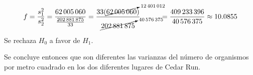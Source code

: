 \begin{solucion}
 \begin{estadistico}
  \begin{equation*}
   f = \frac{s_1^2}{s_2^2}
   = \frac{62\,005\,060}{\frac{202\,881\,875}{33}}
   = \frac{33(\cancelto{12\,401\,012}{62\,005\,060})}
   {\cancelto{40\,576\,375}{202\,881\,875}} \hspace{1cm}
   = \frac{409\,233\,396}{40\,576\,375} \approx 10.0855
  \end{equation*}
 \end{estadistico}

 \begin{decision}
  Se rechaza $H_0$ a favor de $H_1$.
 \end{decision}

 \begin{conclusion}
  Se concluye entonces que son diferentes las varianzas
  del n\'umero de organismos por metro cuadrado
  en los dos diferentes lugares de Cedar Run.
 \end{conclusion}


\end{solucion}
